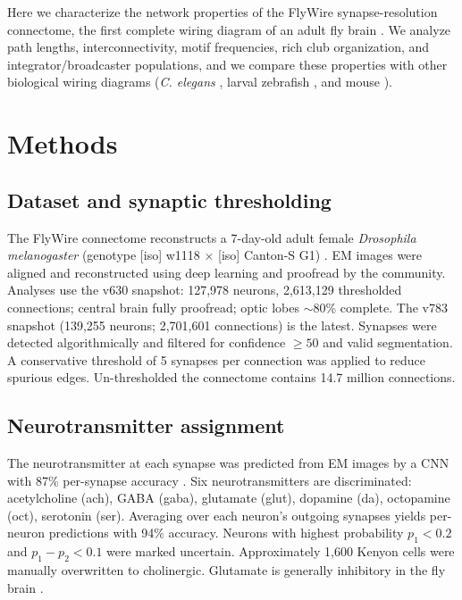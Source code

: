 \documentclass[11pt]{article}
\begin{document}
Here we characterize the network properties of the FlyWire synapse-resolution connectome, the first complete wiring diagram of an adult fly brain \cite{dorkenwald2023neuronal,schlegel2023wholebrain,zheng2018complete,dorkenwald2022flywire}. We analyze path lengths, interconnectivity, motif frequencies, rich club organization, and integrator/broadcaster populations, and we compare these properties with other biological wiring diagrams (\emph{C. elegans} \cite{varshney2011structural,cook2019whole,white1986structure}, larval zebrafish \cite{vishwanathan2017electron}, and mouse \cite{motta2019dense}).

\section{Methods}
\subsection{Dataset and synaptic thresholding}
The FlyWire connectome reconstructs a 7-day-old adult female \emph{Drosophila melanogaster} (genotype [iso] w1118 $\times$ [iso] Canton-S G1) \cite{zheng2018complete}. EM images were aligned and reconstructed using deep learning \cite{dorkenwald2022flywire,dorkenwald2023neuronal} and proofread by the community. Analyses use the v630 snapshot: 127{,}978 neurons, 2{,}613{,}129 thresholded connections; central brain fully proofread; optic lobes $\sim$80\% complete. The v783 snapshot (139{,}255 neurons; 2{,}701{,}601 connections) is the latest. Synapses were detected algorithmically \cite{buhmann2021automatic,heinrich2018synaptic} and filtered for confidence $\geq 50$ and valid segmentation. A conservative threshold of 5 synapses per connection was applied to reduce spurious edges. Un-thresholded the connectome contains 14.7 million connections.

\subsection{Neurotransmitter assignment}
The neurotransmitter at each synapse was predicted from EM images by a CNN with 87\% per-synapse accuracy \cite{eckstein2024neurotransmitter,dorkenwald2023neuronal}. Six neurotransmitters are discriminated: acetylcholine (ach), GABA (gaba), glutamate (glut), dopamine (da), octopamine (oct), serotonin (ser). Averaging over each neuron's outgoing synapses yields per-neuron predictions with 94\% accuracy. Neurons with highest probability $p_1 < 0.2$ and $p_1 - p_2 < 0.1$ were marked uncertain. Approximately 1{,}600 Kenyon cells were manually overwritten to cholinergic. Glutamate is generally inhibitory in the fly brain \cite{liu2013glutamate,mauss2014neural,molina2015glutamate}.
\end{document}
